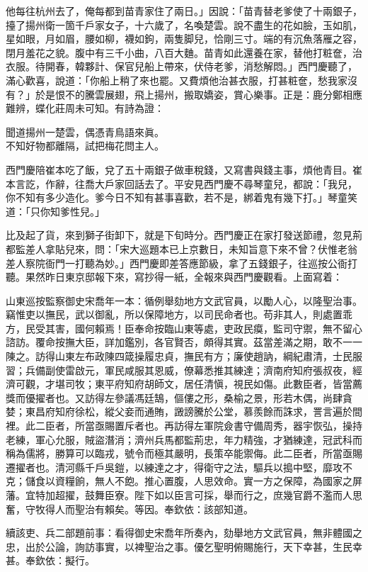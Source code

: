 他每往杭州去了，俺每都到苗青家住了兩日。」因說：「苗青替老爹使了十兩銀子，擡了揚州衛一箇千戶家女子，十六歲了，名喚楚雲。說不盡生的花如臉，玉如肌，星如眼，月如眉，腰如柳，襪如鉤，兩隻脚兒，恰剛三寸。端的有沉魚落雁之容，閉月羞花之貌。腹中有三千小曲，八百大麯。苗青如此還養在家，替他打粧奩，治衣服。待開春，韓夥計、保官兒船上帶來，伏侍老爹，消愁解悶。」西門慶聽了，滿心歡喜，說道：「你船上稍了來也罷。又費煩他治甚衣服，打甚粧奩，愁我家沒有？」於是恨不的騰雲展翅，飛上揚州，搬取嬌姿，賞心樂事。正是：鹿分鄭相應難辨，蝶化莊周未可知。有詩為證：

\begin{myquote} 
聞道揚州一楚雲，偶憑青鳥語來眞。\\不知好物都離隔，試把梅花問主人。
\end{myquote} 

西門慶陪崔本吃了飯，兌了五十兩銀子做車稅錢，又寫書與錢主事，煩他青目。崔本言訖，作辭，往喬大戶家回話去了。平安見西門慶不尋琴童兒，都說：「我兒，你不知有多少造化。爹今日不知有甚事喜歡，若不是，綁着鬼有幾下打。」琴童笑道：「只你知爹性兒。」

比及起了貨，來到獅子街卸下，就是下旬時分。西門慶正在家打發送節禮，忽見荊都監差人拿貼兒來，問：「宋大巡題本已上京數日，{}未知旨意下來不曾？伏惟老翁差人察院衙門一打聽為妙。」西門慶即差答應節級，拿了五錢銀子，往巡按公衙打聽。果然昨日東京邸報下來，寫抄得一紙，全報來與西門慶觀看。上面寫着：

\begin{myquote}[\markfont]
山東巡按監察御史宋喬年一本：循例舉劾地方文武官員，以勵人心，以隆聖治事。竊惟吏以撫民，武以御亂，所以保障地方，以司民命者也。苟非其人，則處置乖方，民受其害，國何賴焉！臣奉命按臨山東等處，吏政民瘼，監司守禦，無不留心諮訪。覆命按撫大臣，詳加鑑別，各官賢否，頗得其實。茲當差滿之期，敢不一一陳之。訪得山東左布政陳四箴操履忠貞，撫民有方；廉使趙訥，綱紀肅清，士民服習；兵備副使雷啟元，軍民咸服其恩威，僚幕悉推其練達；濟南府知府張叔夜，經濟可觀，才堪司牧；東平府知府胡師文，居任清愼，視民如傷。此數臣者，皆當薦獎而優擢者也。又訪得左參議馮廷鵠，傴僂之形，桑榆之景，形若木偶，尚肆貪婪；東昌府知府徐松，縱父妾而通賄，譭謗騰於公堂，慕羨餘而誅求，詈言遍於間裡。此二臣者，所當亟賜置斥者也。再訪得左軍院僉書守備周秀，器宇恢弘，操持老練，軍心允服，賊盜潛消；濟州兵馬都監荊忠，年力精強，才猶練達，冠武科而稱為儒將，勝算可以臨戎，號令而極其嚴明，長策卒能禦侮。此二臣者，所當亟賜遷擢者也。清河縣千戶吳鎧，以練達之才，得衛守之法，驅兵以搗中堅，靡攻不克；儲食以資糧餉，無人不飽。推心置腹，人思效命。實一方之保障，為國家之屏藩。宜特加超擢，鼓舞臣寮。陛下如以臣言可採，舉而行之，庶幾官爵不濫而人思奮，守牧得人而聖治有賴矣。等因。奉欽依：該部知道。

續該吏、兵二部題前事：看得御史宋喬年所奏內，劾舉地方文武官員，無非體國之忠，出於公論，詢訪事實，以裨聖治之事。優乞聖明俯賜施行，天下幸甚，生民幸甚。奉欽依：擬行。
\end{myquote} 

